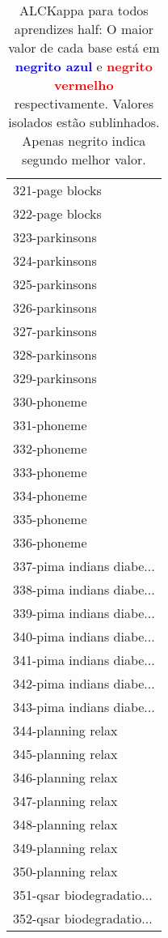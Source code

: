 \begin{table}[h]
\caption{ALCKappa para todos aprendizes half: O maior valor de cada base está em \textcolor{blue}{\textbf{negrito azul}} e \textcolor{red}{\textbf{negrito vermelho}} respectivamente. Valores isolados estão sublinhados. Apenas negrito indica segundo melhor valor.}
\begin{center}\begin{tabular}{l}
 & \\ \hline 321-page blocks &  \\
322-page blocks &  \\
323-parkinsons &  \\
324-parkinsons &  \\
325-parkinsons &  \\
326-parkinsons &  \\
327-parkinsons &  \\ \hline
328-parkinsons &  \\
329-parkinsons &  \\
330-phoneme &  \\
331-phoneme &  \\
332-phoneme &  \\
333-phoneme &  \\
334-phoneme &  \\ \hline
335-phoneme &  \\
336-phoneme &  \\
337-pima indians diabe... &  \\
338-pima indians diabe... &  \\
339-pima indians diabe... &  \\
340-pima indians diabe... &  \\
341-pima indians diabe... &  \\ \hline
342-pima indians diabe... &  \\
343-pima indians diabe... &  \\
344-planning relax &  \\
345-planning relax &  \\
346-planning relax &  \\
347-planning relax &  \\
348-planning relax &  \\ \hline
349-planning relax &  \\
350-planning relax &  \\
351-qsar biodegradatio... &  \\
352-qsar biodegradatio... &  \\\end{tabular}\label{stratsALCKappa10AllReduxHalfb}
\end{center}
\end{table}
